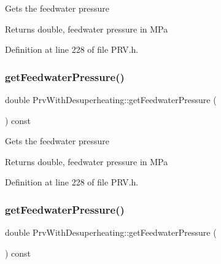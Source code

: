 Gets the feedwater pressure

\begin{DoxyReturn}{Returns}
double, feedwater pressure in M\+Pa 
\end{DoxyReturn}


Definition at line 228 of file P\+R\+V.\+h.

\mbox{\label{class_prv_with_desuperheating_a260bbe19272694af509fb408a821b041}} 
\subsubsection{\texorpdfstring{get\+Feedwater\+Pressure()}{getFeedwaterPressure()}\hspace{0.1cm}{\footnotesize\ttfamily [2/3]}}
{\footnotesize\ttfamily double Prv\+With\+Desuperheating\+::get\+Feedwater\+Pressure (\begin{DoxyParamCaption}{ }\end{DoxyParamCaption}) const\hspace{0.3cm}{\ttfamily [inline]}}

Gets the feedwater pressure

\begin{DoxyReturn}{Returns}
double, feedwater pressure in M\+Pa 
\end{DoxyReturn}


Definition at line 228 of file P\+R\+V.\+h.

\mbox{\label{class_prv_with_desuperheating_a260bbe19272694af509fb408a821b041}} 
\subsubsection{\texorpdfstring{get\+Feedwater\+Pressure()}{getFeedwaterPressure()}\hspace{0.1cm}{\footnotesize\ttfamily [3/3]}}
{\footnotesize\ttfamily double Prv\+With\+Desuperheating\+::get\+Feedwater\+Pressure (\begin{DoxyParamCaption}{ }\end{DoxyParamCaption}) const\hspace{0.3cm}{\ttfamily [inline]}}

